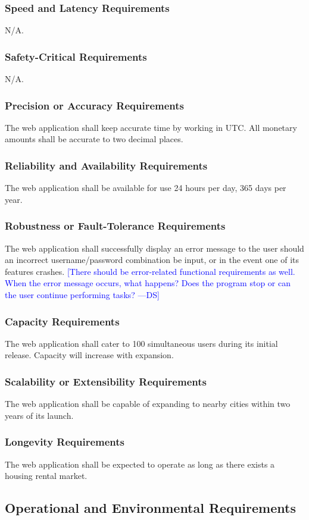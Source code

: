 \documentclass[12pt]{article}
\newcommand{\authornote}[3]{\textcolor{#1}{[#3 ---#2]}}
\newcommand{\authornote}[3]{}
\newcommand{\ds}[1]{\authornote{blue}{DS}{#1}}
\begin{document}
{\subsubsection{Speed and Latency Requirements}
N/A.
\subsubsection{Safety-Critical Requirements}
N/A.
\subsubsection{Precision or Accuracy Requirements}
The web application shall keep accurate time by working in UTC. All monetary 
amounts shall be accurate to two decimal places. 
\subsubsection{Reliability and Availability Requirements}
The web application shall be available for use 24 hours per day, 365 days per 
year.
\subsubsection{Robustness or Fault-Tolerance Requirements}
The web application shall successfully display an error message to the user 
should an incorrect username/password combination be input, or in the event one of its features crashes.  
\ds{There should be error-related functional requirements as well. When the
error message occurs, what happens? Does the program stop or can the user 
continue performing tasks?}
\subsubsection{Capacity Requirements}
The web application shall cater to 100 simultaneous users during its initial release. Capacity will increase with expansion.
\subsubsection{Scalability or Extensibility Requirements}
The web application shall be capable of expanding to nearby cities within two 
years of its launch.
\subsubsection{Longevity Requirements}
The web application shall be expected to operate as long as there exists a 
housing rental market.
\subsection{Operational and Environmental Requirements}
}
\end{document}
